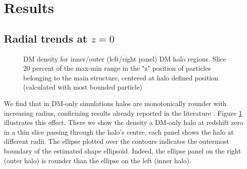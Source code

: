 \documentclass[a4paper,fleqn,usenatbib]{mnras}
\begin{document}
\section{Results}

\subsection{Radial trends at $z=0$}

\begin{figure}
  \centering
  \hfill
  \hfill 
  \caption{DM density for inner/outer (left/right panel) DM halo regions.  
  Slice 20 percent of the max-min range in the "z" position of
  particles belonging to the main structure, centered at halo defined
  position (calculated with most bounded particle) }  
  \label{fig:slices}
\end{figure}

We find that in DM-only simulations halos are monotonically rounder
with increasing radius, confirming results already reported in the
literature \citep{Vera-Ciro_et_al._2011}. 
Figure \ref{fig:slices} illustrates this effect.
There we show the density a DM-only halo at redshift zero in a thin
slice passing through the halo's centre, each panel shows the halo at
different radii.
The ellipse plotted over the contours indicates the outermost
boundary of the estimated shape ellipsoid. 
Indeed, the ellipse panel on the right (outer halo) is rounder than
the ellipse on the left (inner halo). 
\end{document}
